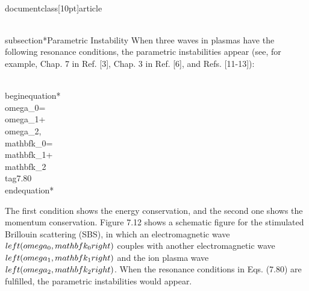 \\documentclass[10pt]{article}
\begin{document}
{{{{\\subsection*{Parametric Instability}
When three waves in plasmas have the following resonance conditions, the parametric instabilities appear (see, for example, Chap. 7 in Ref. [3], Chap. 3 in Ref. [6], and Refs. [11-13]):


\\begin{equation*}
\\omega_{0}=\\omega_{1}+\\omega_{2}, \\mathbf{k}_{0}=\\mathbf{k}_{1}+\\mathbf{k}_{2} \\tag{7.80}
\\end{equation*}


The first condition shows the energy conservation, and the second one shows the momentum conservation. Figure 7.12 shows a schematic figure for the stimulated Brillouin scattering (SBS), in which an electromagnetic wave $\\left(\\omega_{0}, \\mathbf{k}_{0}\\right)$ couples with another electromagnetic wave $\\left(\\omega_{1}, \\mathbf{k}_{1}\\right)$ and the ion plasma wave $\\left(\\omega_{2}, \\mathbf{k}_{2}\\right)$. When the resonance conditions in Eqs. (7.80) are fulfilled, the parametric instabilities would appear.

}}}}
\end{document}
